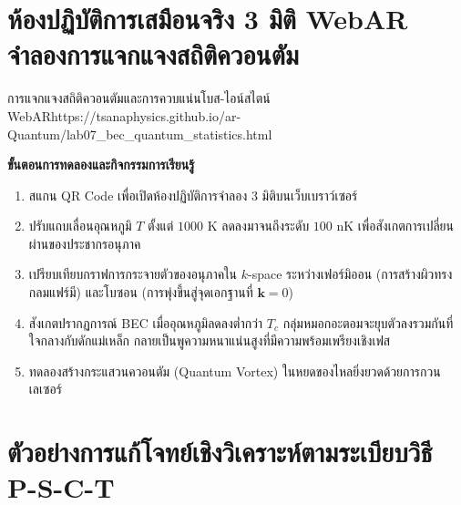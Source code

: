 \section{ห้องปฏิบัติการเสมือนจริง 3 มิติ WebAR จำลองการแจกแจงสถิติควอนตัม}

\begin{qrcodelabbox}{การแจกแจงสถิติควอนตัมและการควบแน่นโบส-ไอน์สไตน์ WebAR}{https://tsanaphysics.github.io/ar-Quantum/lab07_bec_quantum_statistics.html}
\begin{minipage}[c]{0.70\textwidth}
\textbf{ขั้นตอนการทดลองและกิจกรรมการเรียนรู้}
\begin{enumerate}
    \item สแกน QR Code เพื่อเปิดห้องปฏิบัติการจำลอง 3 มิติบนเว็บเบราว์เซอร์
    \item ปรับแถบเลื่อนอุณหภูมิ $T$ ตั้งแต่ $1000\text{ K}$ ลดลงมาจนถึงระดับ $100\text{ nK}$ เพื่อสังเกตการเปลี่ยนผ่านของประชากรอนุภาค
    \item เปรียบเทียบกราฟการกระจายตัวของอนุภาคใน $k$-space ระหว่างเฟอร์มิออน (การสร้างผิวทรงกลมแฟร์มี) และโบซอน (การพุ่งขึ้นสู่จุดเอกฐานที่ $\mathbf{k}=0$)
    \item สังเกตปรากฏการณ์ BEC เมื่ออุณหภูมิลดลงต่ำกว่า $T_c$ กลุ่มหมอกอะตอมจะยุบตัวลงรวมกันที่ใจกลางกับดักแม่เหล็ก กลายเป็นพูความหนาแน่นสูงที่มีความพร้อมเพรียงเชิงเฟส
    \item ทดลองสร้างกระแสวนควอนตัม (Quantum Vortex) ในหยดของไหลยิ่งยวดด้วยการกวนเลเซอร์
\end{enumerate}
\end{minipage}
\hfill
\begin{minipage}[c]{0.25\textwidth}
\centering
{}
\end{minipage}
\end{qrcodelabbox}

\section{ตัวอย่างการแก้โจทย์เชิงวิเคราะห์ตามระเบียบวิธี P-S-C-T}


